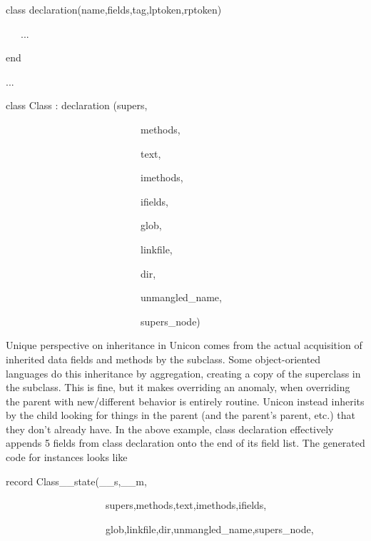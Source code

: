 {\ttfamily\mdseries
class declaration(name,fields,tag,lptoken,rptoken)}

{\ttfamily\mdseries
\ \ \ ...}

{\ttfamily\mdseries
end}

{\ttfamily\mdseries
...}

{\ttfamily\mdseries
class Class : declaration (supers,}

{\ttfamily\mdseries
\ \ \ \ \ \ \ \ \ \ \ \ \ \ \ \ \ \ \ \ \ \ \ \ \ \ \ methods,}

{\ttfamily\mdseries
\ \ \ \ \ \ \ \ \ \ \ \ \ \ \ \ \ \ \ \ \ \ \ \ \ \ \ text,}

{\ttfamily\mdseries
\ \ \ \ \ \ \ \ \ \ \ \ \ \ \ \ \ \ \ \ \ \ \ \ \ \ \ imethods,}

{\ttfamily\mdseries
\ \ \ \ \ \ \ \ \ \ \ \ \ \ \ \ \ \ \ \ \ \ \ \ \ \ \ ifields,}

{\ttfamily\mdseries
\ \ \ \ \ \ \ \ \ \ \ \ \ \ \ \ \ \ \ \ \ \ \ \ \ \ \ glob,}

{\ttfamily\mdseries
\ \ \ \ \ \ \ \ \ \ \ \ \ \ \ \ \ \ \ \ \ \ \ \ \ \ \ linkfile,}

{\ttfamily\mdseries
\ \ \ \ \ \ \ \ \ \ \ \ \ \ \ \ \ \ \ \ \ \ \ \ \ \ \ dir,}

{\ttfamily\mdseries
\ \ \ \ \ \ \ \ \ \ \ \ \ \ \ \ \ \ \ \ \ \ \ \ \ \ \ unmangled\_name,}

{\ttfamily\mdseries
\ \ \ \ \ \ \ \ \ \ \ \ \ \ \ \ \ \ \ \ \ \ \ \ \ \ \ supers\_node)}


Unique perspective on inheritance in Unicon comes from the actual
acquisition of inherited data fields and methods by the subclass. Some
object-oriented languages do this inheritance {\textquotedbl}by
aggregation{\textquotedbl}, creating a copy of the superclass in the
subclass. This is fine, but it makes
{\textquotedbl}overriding{\textquotedbl} an anomaly, when overriding
the parent with new/different behavior is entirely routine. Unicon
instead inherits by the child looking for things in the parent (and
the parent's parent, etc.) that they don't already have. In the above
example, class declaration effectively appends 5 fields from class
declaration onto the end of its field list. The generated code for
instances looks like

{\ttfamily\mdseries
record Class\_\_state(\_\_s,\_\_m,}

{\ttfamily\mdseries
\ \ \ \ \ \ \ \ \ \ \ \ \ \ \ \ \ \ \ \ supers,methods,text,imethods,ifields,}

{\ttfamily\mdseries
\ \ \ \ \ \ \ \ \ \ \ \ \ \ \ \ \ \ \ \ glob,linkfile,dir,unmangled\_name,supers\_node,}

